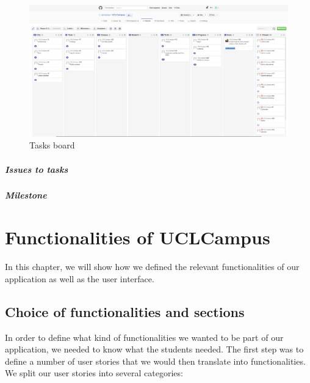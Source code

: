 \documentclass[11pt, a4paper]{report}
\begin{document}
\begin{figure}
\centering
\includegraphics[scale = 0.5, angle = 90]{Images/dashboard.png}
\caption{Tasks board}
\end{figure}

\paragraph{Issues to tasks}

\paragraph{Milestone}

\chapter{Functionalities of UCLCampus}

In this chapter, we will show how we defined the relevant functionalities of our application as well as the user interface.

\section{Choice of functionalities and sections}


In order to define what kind of functionalities we wanted to be part of our application, we needed to know what the students needed. The first step was to define a number of user stories that we would then translate into functionalities.\\ 
We split our user stories into several categories:
\end{document}
